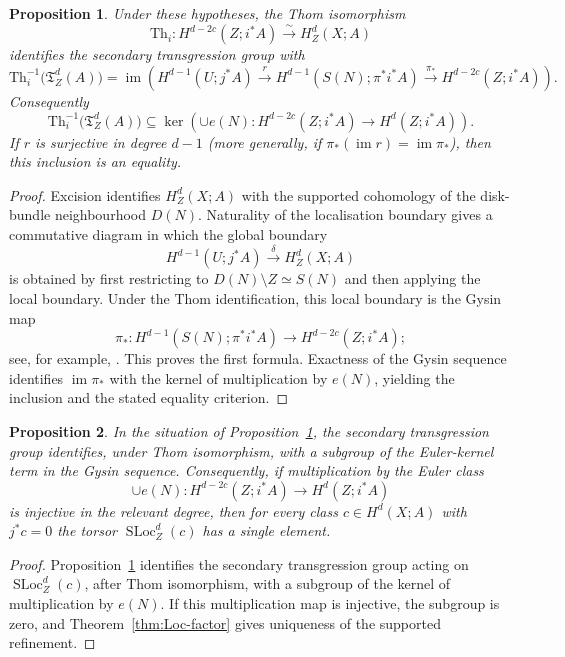 \documentclass[10pt,a4paper,dvipsnames,x11names]{amsart}
\newcommand{\Th}{\mathrm{Th}}
\newcommand{\SLoc}{\operatorname{SLoc}}
\newcommand{\TLoc}{\mathfrak T}
\numberwithin{equation}{section}
\theoremstyle{plain}
\newtheorem{proposition}[proposition]{Proposition}
\theoremstyle{definition}
\theoremstyle{remark}
\begin{document}
\begin{proposition}\label{prop:ambiguity-link-transgression}
Under these hypotheses, the Thom isomorphism
\[
\Th_i:H^{d-2c}(Z;i^*A)\xrightarrow{\ \sim\ }H_Z^d(X;A)
\]
identifies the secondary transgression group with
\[
\Th_i^{-1}\bigl(\TLoc_Z^d(A)\bigr)
=
\operatorname{im}\!\left(
H^{d-1}(U;j^*A)
\xrightarrow{\ r\ }
H^{d-1}(S(N);\pi^*i^*A)
\xrightarrow{\ \pi_*\ }
H^{d-2c}(Z;i^*A)
\right).
\]
Consequently
\[
\Th_i^{-1}\bigl(\TLoc_Z^d(A)\bigr)
\subseteq
\ker\!\left(
\cup e(N):H^{d-2c}(Z;i^*A)\longrightarrow H^d(Z;i^*A)
\right).
\]
If $r$ is surjective in degree $d-1$ (more generally, if $\pi_*(\operatorname{im}r)=\operatorname{im}\pi_*$), then this inclusion is an equality.
\end{proposition}

\begin{proof}
Excision identifies $H_Z^d(X;A)$ with the supported cohomology of the disk-bundle neighbourhood $D(N)$.  Naturality of the localisation boundary gives a commutative diagram in which the global boundary
\[
H^{d-1}(U;j^*A)\xrightarrow{\delta}H_Z^d(X;A)
\]
is obtained by first restricting to $D(N)\setminus Z\simeq S(N)$ and then applying the local boundary.  Under the Thom identification, this local boundary is the Gysin map
\[
\pi_*:H^{d-1}(S(N);\pi^*i^*A)\longrightarrow H^{d-2c}(Z;i^*A);
\]
see, for example, \cite{BottTu}.  This proves the first formula.  Exactness of the Gysin sequence identifies $\operatorname{im}\pi_*$ with the kernel of multiplication by $e(N)$, yielding the inclusion and the stated equality criterion.
\end{proof}


\begin{proposition}\label{prop:canonicity-before-euler-inversion}
In the situation of Proposition~\ref{prop:ambiguity-link-transgression}, the secondary transgression group identifies, under Thom isomorphism, with a subgroup of the Euler-kernel term in the Gysin sequence.  Consequently, if multiplication by the Euler class
\[
\cup e(N):H^{d-2c}(Z;i^*A)\longrightarrow H^d(Z;i^*A)
\]
is injective in the relevant degree, then for every class \(c\in H^d(X;A)\) with \(j^*c=0\) the torsor \(\SLoc^d_Z(c)\) has a single element.
\end{proposition}

\begin{proof}
Proposition~\ref{prop:ambiguity-link-transgression} identifies the secondary transgression group acting on \(\SLoc^d_Z(c)\), after Thom isomorphism, with a subgroup of the kernel of multiplication by \(e(N)\).  If this multiplication map is injective, the subgroup is zero, and Theorem~\ref{thm:Loc-factor} gives uniqueness of the supported refinement.
\end{proof}
\end{document}
